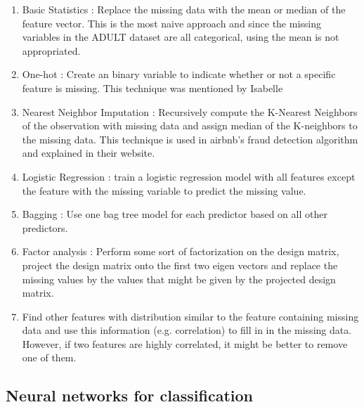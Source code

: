 \documentclass[12pt]{article}
\begin{document}
\begin{enumerate}
\item Basic Statistics : Replace the missing data with the mean or median of the feature vector. This is the most naive approach and since the missing variables in the ADULT dataset are all categorical, using the mean is not appropriated.
\item One-hot : Create an binary variable to indicate whether or not a specific feature is missing. This technique was mentioned by Isabelle
\item Nearest Neighbor Imputation : Recursively compute the K-Nearest Neighbors of the observation with missing data and assign median of the K-neighbors to the missing data. This technique is used in airbnb's fraud detection algorithm and explained in their website.
\item Logistic Regression : train a logistic regression model with all features except the feature with the missing variable to predict the missing value.
\item Bagging : Use one bag tree model for each predictor based on all other
   predictors.
\item Factor analysis : Perform some sort of factorization on the design matrix, project the design matrix onto the first two eigen vectors and replace the missing values by the values that might be given by the projected design matrix.
\item Find other features with distribution similar to the feature containing missing data and use this information (e.g. correlation) to fill in in the missing data. However, if two features are highly correlated, it might be better to remove one of them.
\end{enumerate}

\subsection{Neural networks for classification}

\pagebreak




%
%

\itemize
\end{document}
